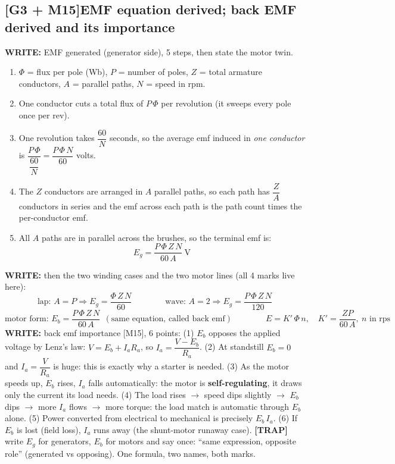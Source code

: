 \documentclass[11pt]{article}
\newcommand{\q}[2]{\subsection*{\color{copper}#1\quad\color{iron}#2}}
\newcommand{\w}[1]{\textbf{\color{copper}WRITE:} #1}
\newcommand{\tr}[1]{\textbf{\color{red}[TRAP]} #1}
\begin{document}
\q{[G3 + M15]}{EMF equation derived; back EMF derived and its importance}
\w{EMF generated (generator side), 5 steps, then state the motor twin.}
\begin{enumerate}[label=S\arabic*.]
\item $\Phi$ = flux per pole (Wb), $P$ = number of poles, $Z$ = total armature conductors, $A$ = parallel paths, $N$ = speed in rpm.
\item One conductor cuts a total flux of $P\,\Phi$ per revolution (it sweeps every pole once per rev).
\item One revolution takes $\dfrac{60}{N}$ seconds, so the average emf induced in \emph{one conductor} is $\dfrac{P\,\Phi}{\dfrac{60}{N}} = \dfrac{P\,\Phi\, N}{60}$ volts.
\item The $Z$ conductors are arranged in $A$ parallel paths, so each path has $\dfrac{Z}{A}$ conductors in series and the emf across each path is the path count times the per-conductor emf.
\item All $A$ paths are in parallel across the brushes, so the terminal emf is:
\[
\boxed{E_g = \dfrac{P\,\Phi\, Z\, N}{60\, A}\ \text{V}}
\]
\end{enumerate}
\w{then the two winding cases and the two motor lines (all 4 marks live here):}
\[
\text{lap: } A = P \Rightarrow E_g = \dfrac{\Phi\, Z\, N}{60}
\qquad\qquad
\text{wave: } A = 2 \Rightarrow E_g = \dfrac{P\,\Phi\, Z\, N}{120}
\]
\[
\text{motor form: } \boxed{E_b = \dfrac{P\,\Phi\, Z\, N}{60\, A}}\ \ (\text{same equation, called back emf})
\qquad\qquad
E = K'\, \Phi\, n,\quad K' = \dfrac{Z P}{60\, A},\ n \text{ in rps}
\]
\w{back emf importance [M15], 6 points:} (1) $E_b$ opposes the applied voltage by Lenz's law: $V = E_b + I_a R_a$, so $I_a = \dfrac{V - E_b}{R_a}$. (2) At standstill $E_b = 0$ and $I_a = \dfrac{V}{R_a}$ is huge: this is exactly why a starter is needed. (3) As the motor speeds up, $E_b$ rises, $I_a$ falls automatically: the motor is \textbf{self-regulating}, it draws only the current its load needs. (4) The load rises $\rightarrow$ speed dips slightly $\rightarrow$ $E_b$ dips $\rightarrow$ more $I_a$ flows $\rightarrow$ more torque: the load match is automatic through $E_b$ alone. (5) Power converted from electrical to mechanical is precisely $E_b\, I_a$. (6) If $E_b$ is lost (field loss), $I_a$ runs away (the shunt-motor runaway case).
\tr{write $E_g$ for generators, $E_b$ for motors and say once: ``same expression, opposite role'' (generated vs opposing). One formula, two names, both marks.}
\end{document}
